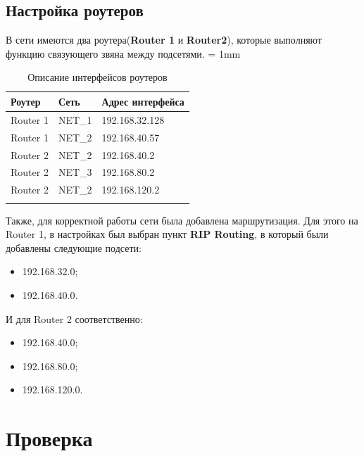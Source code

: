 \documentclass[a4paper, 12pt]{article}		%
\begin{document}
\subsection{Настройка роутеров}
В сети имеются два роутера(\textbf{Router 1} и \textbf{Router2}), которые выполняют функцию связующего звяна между подсетями.
\tabulinesep = 1mm
\begin{longtabu} to \textwidth {|X[c , m ] |X[c , m ] | X[c, m ]|}\firsthline\hline
\textbf{Роутер}&\textbf{Сеть}&\textbf{Адрес интерфейса}\\ \hline \endfirsthead
Router 1&NET\_1&192.168.32.128\\ \hline
Router 1&NET\_2&192.168.40.57\\ \hline
Router 2&NET\_2&192.168.40.2\\ \hline
Router 2&NET\_3&192.168.80.2\\ \hline
Router 2&NET\_2&192.168.120.2\\ \hline
\caption{Описание интерфейсов роутеров}
\end{longtabu}
Также, для корректной работы сети была добавлена маршрутизация. Для этого на Router 1, в настройках был выбран пункт \textbf{RIP Routing}, в который были добавлены следующие подсети:
\begin{itemize}
\item 192.168.32.0;
\item 192.168.40.0.
\end{itemize}
И для Router 2 соответственно:
\begin{itemize}
\item 192.168.40.0;
\item 192.168.80.0;
\item 192.168.120.0.
\end{itemize}

\section{Проверка}
\end{document}

